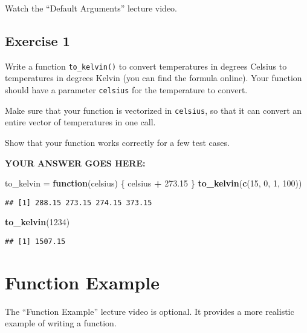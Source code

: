 \documentclass[
]{article}
\newenvironment{Shaded}{\begin{snugshade}}{\end{snugshade}}
\newcommand{\ControlFlowTok}[1]{\textcolor[rgb]{0.13,0.29,0.53}{\textbf{#1}}}
\newcommand{\DecValTok}[1]{\textcolor[rgb]{0.00,0.00,0.81}{#1}}
\newcommand{\FloatTok}[1]{\textcolor[rgb]{0.00,0.00,0.81}{#1}}
\newcommand{\KeywordTok}[1]{\textcolor[rgb]{0.13,0.29,0.53}{\textbf{#1}}}
\newcommand{\NormalTok}[1]{#1}
\newcommand{\OperatorTok}[1]{\textcolor[rgb]{0.81,0.36,0.00}{\textbf{#1}}}
\newcommand{\StringTok}[1]{\textcolor[rgb]{0.31,0.60,0.02}{#1}}
\begin{document}
Watch the ``Default Arguments'' lecture video.

\hypertarget{exercise-1}{%
\subsection{Exercise 1}\label{exercise-1}}

Write a function \texttt{to\_kelvin()} to convert temperatures in
degrees Celsius to temperatures in degrees Kelvin (you can find the
formula online). Your function should have a parameter \texttt{celsius}
for the temperature to convert.

Make sure that your function is vectorized in \texttt{celsius}, so that
it can convert an entire vector of temperatures in one call.

Show that your function works correctly for a few test cases.

\textbf{YOUR ANSWER GOES HERE:}

\begin{Shaded}
\begin{Highlighting}[]
\NormalTok{to\_kelvin =}\StringTok{ }\ControlFlowTok{function}\NormalTok{(celsius) \{}
\NormalTok{    celsius }\OperatorTok{+}\StringTok{ }\FloatTok{273.15}
\NormalTok{\}}
\KeywordTok{to\_kelvin}\NormalTok{(}\KeywordTok{c}\NormalTok{(}\DecValTok{15}\NormalTok{, }\DecValTok{0}\NormalTok{, }\DecValTok{1}\NormalTok{, }\DecValTok{100}\NormalTok{))}
\end{Highlighting}
\end{Shaded}

\begin{verbatim}
## [1] 288.15 273.15 274.15 373.15
\end{verbatim}

\begin{Shaded}
\begin{Highlighting}[]
\KeywordTok{to\_kelvin}\NormalTok{(}\DecValTok{1234}\NormalTok{)}
\end{Highlighting}
\end{Shaded}

\begin{verbatim}
## [1] 1507.15
\end{verbatim}

\hypertarget{function-example}{%
\section{Function Example}\label{function-example}}

The ``Function Example'' lecture video is optional. It provides a more
realistic example of writing a function.
\end{document}
